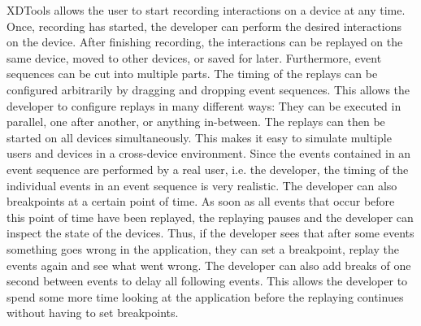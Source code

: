 XDTools allows the user to start recording interactions on a device at any time. Once, recording has started, the developer can perform the desired interactions on the device. After finishing recording, the interactions can be replayed on the same device, moved to other devices, or saved for later.  Furthermore, event sequences can be cut into multiple parts. The timing of the replays can be configured arbitrarily by dragging and dropping event sequences. This allows the developer to configure replays in many different ways: They can be executed in parallel, one after another, or anything in-between. The replays can then be started on all devices simultaneously. This makes it easy to simulate multiple users and devices in a cross-device environment. Since the events contained in an event sequence are performed by a real user, i.e. the developer, the timing of the individual events in an event sequence is very realistic. The developer can also breakpoints at a certain point of time. As soon as all events that occur before this point of time have been replayed, the replaying pauses and the developer can inspect the state of the devices. Thus, if the developer sees that after some events something goes wrong in the application, they can set a breakpoint, replay the events again and see what went wrong. The developer can also add breaks of one second between events to delay all following events. This allows the developer to spend some more time looking at the application before the replaying continues without having to set breakpoints. 